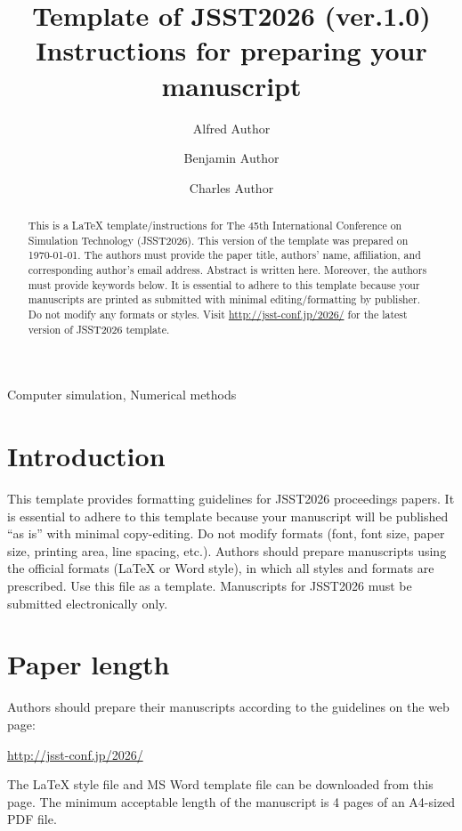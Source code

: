 \documentclass[proceedings]{jasse-modern}%
\title{Template of JSST2026 (ver.1.0)\\ Instructions for preparing your manuscript}
\author[1,*]{Alfred Author}%
\author[2,4]{Benjamin Author}
\author[3]{Charles Author}
\affil[1]{{Department of Simulation, School of Technology, Japan University}}
\affil[2]{{Affiliation 2}}
\affil[3]{{Affiliation 3}}
\affil[4]{{Affiliation 4}}
\begin{document}
\maketitle
\thispagestyle{titlepage}

\begin{abstract}
This is a {\LaTeX} template/instructions for The 45th International Conference on Simulation Technology (JSST2026).
This version of the template was prepared on \today.
The authors must provide the paper title, authors' name, affiliation, and corresponding author's email address.
Abstract is written here.
Moreover, the authors must provide keywords below.
It is essential to adhere to this template because your manuscripts are printed as
submitted with minimal editing/formatting by publisher.
Do not modify any formats or styles.
Visit \url{http://jsst-conf.jp/2026/} for the latest version of JSST2026 template.
\end{abstract}

\begin{keywords}
Computer simulation, Numerical methods
\end{keywords}

\section{Introduction}

This template provides formatting guidelines for JSST2026 proceedings papers. It is essential to adhere to this template because your manuscript will be published ``as is'' with minimal copy-editing. Do not modify formats (font, font size, paper size, printing area, line spacing, etc.). Authors should prepare manuscripts using the official formats (LaTeX or Word style), in which all styles and formats are prescribed. Use this file as a template. Manuscripts for JSST2026 must be submitted electronically only.

\section{Paper length}
Authors should prepare their manuscripts according to the guidelines on the web page:
\begin{center}
\url{http://jsst-conf.jp/2026/}
\end{center}
The LaTeX style file and MS Word template file can be downloaded from this page.
The minimum acceptable length of the manuscript is 4 pages of an A4-sized PDF file.
\end{document}
